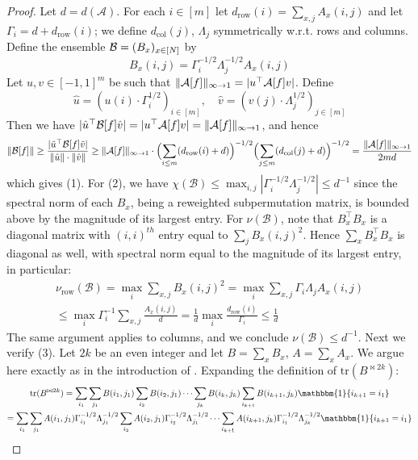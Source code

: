 \begin{proof}
Let $d = d(\mathcal{A})$. For each $i \in [m]$ let $d_\mathrm{row}(i) = \sum_{x,j} A_x(i,j)$ and let $\Gamma_i = d + d_\mathrm{row}(i)$; we define $d_\mathrm{col}(j)$, $\Lambda_j$ symmetrically w.r.t. rows and columns. Define the ensemble $\mathcal{B}=(B_x)_{x \in [N]}$ by
\[
B_x(i,j) = \Gamma_i^{-1/2}\Lambda_j^{-1/2} A_x(i,j)
\]
Let $u,v \in [-1,1]^{m}$ be such that $\Vert \mathcal{A}[f] \Vert_{\infty \to 1} = |u^\top \mathcal{A}[f] v|$. Define 
\[
\hat{u} = (u(i) \cdot \Gamma_i^{1/2})_{i \in [m]}, \quad \hat{v} = (v(j) \cdot \Lambda_j^{1/2})_{j \in [m]}
\]
Then we have $|\hat{u}^\top \mathcal{B}[f] \hat{v}|= |u^\top \mathcal{A}[f] v | = \Vert \mathcal{A}[f] \Vert_{\infty\to 1}$, and hence
\[
\Vert \mathcal{B}[f] \Vert \geq  \frac{| \tilde{u}^\top \mathcal{B}[f] \tilde{v}|}{\Vert \hat{u} \Vert\cdot \Vert \hat{v} \Vert} \geq  \Vert \mathcal{A}[f] \Vert_{\infty \to 1} \cdot \Bigl(\sum_{i \leq m} (d_\mathrm{row}(i) + d) \Bigr)^{-1/2} \Bigl(\sum_{j \leq m} (d_\mathrm{col}(j) + d) \Bigr)^{-1/2} = \frac{\Vert \mathcal{A}[f] \Vert_{\infty \to 1}}{2md}
\]
which gives (1). For (2), we have $\chi(\mathcal{B}) \leq \max_{i,j}|\Gamma_i^{-1/2} \Lambda_j^{-1/2}| \leq d^{-1}$ since the spectral norm of each $B_x$, being a reweighted subpermutation matrix, is bounded above by the magnitude of its largest entry. For $\nu(\mathcal{B})$, note that $B^\top_x B_x$ is a diagonal matrix with $(i,i)^{th}$ entry equal to $\sum_{j} B_x(i,j)^2$. Hence $\sum_x B^\top_x B_x$ is diagonal as well, with spectral norm equal to the magnitude of its largest entry, in particular:
\begin{gather}
\nu_\mathrm{row}(\mathcal{B})  =  \max_{i} \sum_{x,j} B_x(i,j)^2  = \max_{i} \sum_{x,j} \Gamma_i \Lambda_j A_x(i,j)\\\leq  \max_{i} \Gamma_i^{-1}\sum_{x,j} \frac{A_x(i,j)}{d }
= \frac{1}{d} \max_i \frac{d_{\mathrm{row}}(i)}{\Gamma_i} \leq \frac{1}{d}
\end{gather}
The same argument applies to columns, and we conclude $\nu(\mathcal{B}) \leq d^{-1}$.
Next we verify (3). Let $2k$ be an even integer and let $B = \sum_x B_x$, $A = \sum_x A_x$. We argue here exactly as in the introduction of \cite{simpler-moore}. Expanding the definition of $\mathrm{tr}({B}^{\bowtie 2k})$:
\begin{gather*}
\mathrm{tr}(B^{\bowtie 2k})  
 = \sum_{i_1} \sum_{j_1} B(i_1,j_1)  \sum_{i_2} B(i_2,j_1) \cdots \sum_{j_k} B(i_k,j_k) \sum_{i_{k+1}} B(i_{k+1},j_k) \mathbbm{1}\{i_{k+1}=i_1\}\\
  = \sum_{i_1} \sum_{j_1} A(i_1,j_1) \Gamma_{i_1}^{-1/2} \Lambda_{j_1}^{-1/2}  \sum_{i_2} A(i_2,j_1)  \Gamma_{i_2}^{-1/2} \Lambda_{j_1}^{-1/2}\cdots \sum_{i_{k+1}} A(i_{k+1},j_k) \Gamma_{i_{1}}^{-1/2} \Lambda_{j_k}^{-1/2} \mathbbm{1}\{i_{k+1} = i_1\}\\

\end{gather*}
\end{proof}
